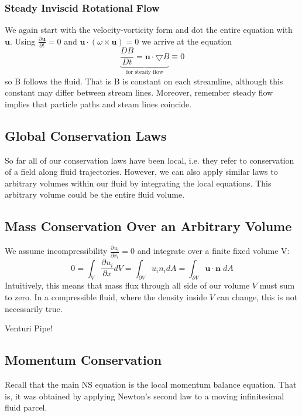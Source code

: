 \documentclass[11pt]{article}
\newcommand*{\pd}[3][]{\ensuremath{\frac{\partial^{#1} {#2}}{\partial {#3}^{#1}}}}
\newcommand*{\md}[1]{\ensuremath{\frac{D #1}{D t}}}
\newcommand{\grad}{\bigtriangledown}
\newcommand{\mv}[1]{\textbf{#1}}
\newenvironment{eg}
    {\begin{mdframed}[backgroundcolor=mylg, roundcorner=5pt, linewidth=0pt]}
    {\end{mdframed}}
\begin{document}
\subsubsection{Steady Inviscid Rotational Flow}
We again start with the velocity-vorticity form and dot the entire equation with $\mv{u}$. Using $\pd{\mv{u}}{t}=0$ and $\mv{u}\cdot(\omega\times\mv{u})=0$ we arrive at the equation
$$\underbrace{\md{B}=\mv{u}\cdot\grad B}_{\text{for steady flow}} \equiv 0$$
so B follows the fluid. That is B is constant on each streamline, although this constant may differ between stream lines. Moreover, remember steady flow implies that particle paths and steam lines coincide.
\subsection{Global Conservation Laws}
So far all of our conservation laws have been local, i.e. they refer to conservation of a field along fluid trajectories. However, we can also apply similar laws to arbitrary volumes within our fluid by integrating the local equations. This arbitrary volume could be the entire fluid volume.
\subsection{Mass Conservation Over an Arbitrary Volume}
We assume incompressibility $\pd{u_i}{x_i}=0$ and integrate over a finite fixed volume V:
$$0=\int_V \pd{u_i}{x}dV=\int_{\partial V}u_in_idA=\int_{\partial V}\mv{u}\cdot\mv{n}\;dA$$
Intuitively, this means that mass flux through all side of our volume $V$ must sum to zero. In a compressible fluid, where the density inside $V$ can change, this is not necessarily true.
\begin{eg}
Venturi Pipe!
\end{eg}
\subsection{Momentum Conservation}
Recall that the main NS equation is the local momentum balance equation. That is, it was obtained by applying Newton's second law to a moving infinitesimal fluid parcel.
\end{document}
